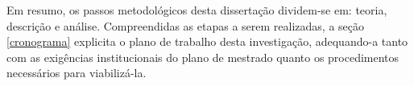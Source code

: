 Em resumo, os passos metodológicos desta dissertação dividem-se em: teoria, descrição e análise. Compreendidas as etapas a serem realizadas, a seção \ref{cronograma} explicita o plano de trabalho desta investigação, adequando-a tanto com as exigências institucionais do plano de mestrado quanto os procedimentos necessários para viabilizá-la.